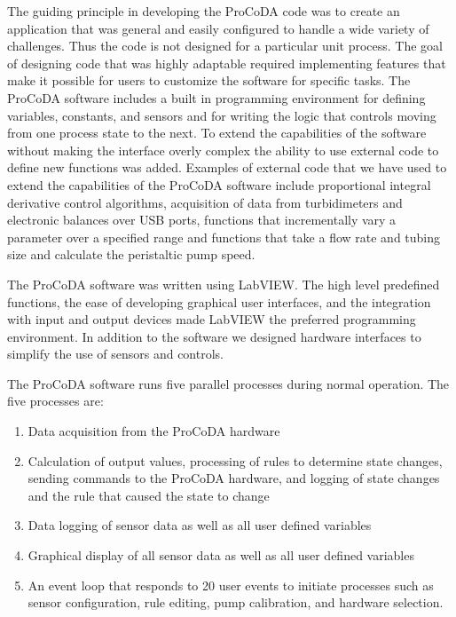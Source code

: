 \documentclass[letterpaper,10pt,english]{sphinxmanual}
\begin{document}
The guiding principle in developing the ProCoDA code was to create an application that was general and easily configured to handle a wide variety of challenges. Thus the code is not designed for a particular unit process. The goal of designing code that was highly adaptable required implementing features that make it possible for users to customize the software for specific tasks. The ProCoDA software includes a built in programming environment for defining variables, constants, and sensors and for writing the logic that controls moving from one process state to the next. To extend the capabilities of the software without making the interface overly complex the ability to use external code to define new functions was added. Examples of external code that we have used to extend the capabilities of the ProCoDA software include proportional integral derivative control algorithms, acquisition of data from turbidimeters and electronic balances over USB ports, functions that incrementally vary a parameter over a specified range and functions that take a flow rate and tubing size and calculate the peristaltic pump speed.

The ProCoDA software was written using LabVIEW. The high level predefined functions, the ease of developing graphical user interfaces, and the integration with input and output devices made LabVIEW the preferred programming environment. In addition to the software we designed hardware interfaces to simplify the use of sensors and controls.

The ProCoDA software runs five parallel processes during normal operation. The five processes are:
\begin{enumerate}
\item {} 
Data acquisition from the ProCoDA hardware

\item {} 
Calculation of output values, processing of rules to determine state changes, sending commands to the ProCoDA hardware, and logging of state changes and the rule that caused the state to change

\item {} 
Data logging of sensor data as well as all user defined variables

\item {} 
Graphical display of all sensor data as well as all user defined variables

\item {} 
An event loop that responds to 20 user events to initiate processes such as sensor configuration, rule editing, pump calibration, and hardware selection.

\end{enumerate}
\end{document}

